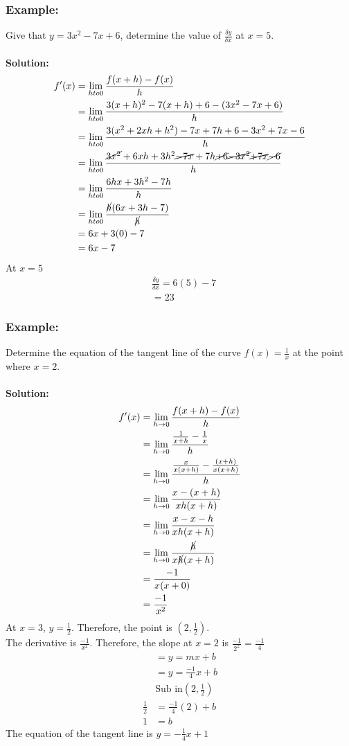 \documentclass{article}
\begin{document}
\subsubsection*{Example:}
Give that $y=3x^2-7x+6$, determine the value of $\frac{\delta y}{\delta x}$ at $x=5$. \\ \\ 
\textbf{Solution:}
\begin{align*}
    f'(x)&=\lim_{h to 0} \frac{f(x+h)-f(x)}{h}\\
    &=\lim_{h to 0} \frac{3(x+h)^2-7(x+h)+6-(3x^2-7x+6)}{h}\\
    &=\lim_{h to 0} \frac{3(x^2+2xh+h^2)-7x+7h+6-3x^2+7x-6}{h}\\
    &=\lim_{h to 0} \frac{\cancel{3x^2}+6xh+3h^2\cancel{-7x}+7h\cancel{+6}\cancel{-3x^2}\cancel{+7x}\cancel{-6}}{h}\\
    &= \lim_{h to 0} \frac{6hx+3h^2-7h}{h}\\
    &= \lim_{h to 0} \frac{\cancel{h}(6x+3h-7)}{\cancel{h}}\\
    &=6x+3(0)-7\\
    &= 6x-7
\end{align*}
At $x=5$ 
\begin{align*}
    &\frac{\delta y}{\delta x}=6(5)-7\\
    &=23
\end{align*}
\newpage
\subsubsection*{Example:}
Determine the equation of the tangent line of the curve $f(x)= \frac{1}{x}$ at the point where $x=2$.\\ \\ 
\textbf{Solution:}
\begin{align*}
    f'(x) &=\lim_{h \to 0}\frac{f(x+h)-f(x)}{h}\\
    &=\lim_{h \to 0}\frac{\frac{1}{x+h}-\frac{1}{x}}{h}\\
    &=\lim_{h \to 0} \frac{\frac{x}{x(x+h)} -\frac{(x+h)}{x(x+h)}}{h}\\
    &=\lim_{h \to 0} \frac{x-(x+h)}{xh(x+h)}\\
    &=\lim_{h \to 0} \frac{x-x-h}{xh(x+h)}\\
    &=\lim_{h \to 0} \frac{\cancel{h}}{x\cancel{h}(x+h)}\\
    &=\frac{-1}{x(x+0)}\\
    &=\frac{-1}{x^2}
\end{align*}
At $x=3$, $y=\frac{1}{2}$. Therefore, the point is $\left(2,\frac{1}{2}\right)$.\\
The derivative is $\frac{-1}{x^2}$. Therefore, the slope at $x=2$ is $\frac{-1}{2^2}=\frac{-1}{4}$
\begin{align*}
    &= y=mx+b\\
    &= y=\frac{-1}{4}x+b\\
    & \text{Sub in} \left(2,\frac{1}{2}\right)\\
    \frac{1}{2} &= \frac{-1}{4}(2)+b\\
    1 &=b
\end{align*}
The equation of the tangent line is $y=-\frac{1}{4}x+1$
\newpage 
\end{document}
